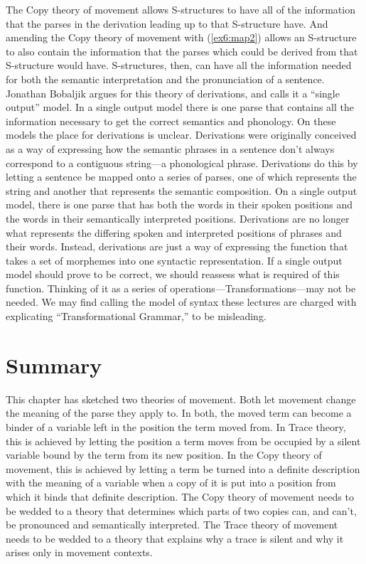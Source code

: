 The Copy theory of movement allows S-structures to have all of the information that the parses in the derivation leading up to that S-structure have. And amending the Copy theory of movement with (\ref{ex6:map2}) allows an S-structure to also contain the information that the parses which could be derived from that S-structure would have. S-structures, then, can have all the information needed for both the semantic interpretation and the pronunciation of a sentence. Jonathan Bobaljik\cite{Bobaljik:1995a} argues for this theory of derivations, and calls it a ``single output'' model. In a single output model there is one parse that contains all the information necessary to get the correct semantics and phonology. On these models the place for derivations is unclear. Derivations were originally conceived as a way of expressing how the semantic phrases in a sentence don't always correspond to a contiguous string---a phonological phrase. Derivations do this by letting a sentence be mapped onto a series of parses, one of which represents the string and another that represents the semantic composition. On a single output model, there is one parse that has both the words in their spoken positions and the words in their semantically interpreted positions. Derivations are no longer what represents the differing spoken and interpreted positions of phrases and their words. Instead, derivations are just a way of expressing the function that takes a set of morphemes into one syntactic representation. If a single output model should prove to be correct, we should reassess what is required of this function. Thinking of it as a series of operations---Transformations---may not be needed. We may find calling the model of syntax these lectures are charged with explicating ``Transformational Grammar,'' to be misleading.

\section{Summary}
\label{sec:summary}

This chapter has sketched two theories of movement. Both let movement change the meaning of the parse they apply to. In both, the moved term can become a binder of a variable left in the position the term moved from. In Trace theory, this is achieved by letting the position a term moves from be occupied by a silent variable bound by the term from its new position. In the Copy theory of movement, this is achieved by letting a term be turned into a definite description with the meaning of a variable when a copy of it is put into a position from which it binds that definite description. The Copy theory of movement needs to be wedded to a theory that determines which parts of two copies can, and can't, be pronounced and semantically interpreted. The Trace theory of movement needs to be wedded to a theory that explains why a trace is silent and why it arises only in movement contexts.

